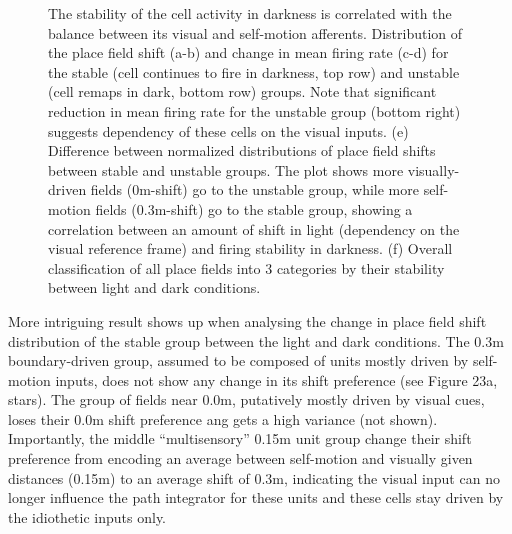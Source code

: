 \begin{figure}
\captionsetup{format=plain}
\caption[Stability explained by self-motion inputs]{
The stability of the cell activity in darkness is correlated with the balance between its visual and self-motion afferents. Distribution of the place field shift (a-b) and change in mean firing rate (c-d) for the stable (cell continues to fire in darkness, top row) and unstable (cell remaps in dark, bottom row) groups. Note that significant reduction in mean firing rate for the unstable group (bottom right) suggests dependency of these cells on the visual inputs. (e) Difference between normalized distributions of place field shifts between stable and unstable groups. The plot shows more visually-driven fields (0m-shift) go to the unstable group, while more self-motion fields (0.3m-shift) go to the stable group, showing a correlation between an amount of shift in light (dependency on the visual reference frame) and firing stability in darkness. (f) Overall classification of all place fields into 3 categories by their stability between light and dark conditions.
}
\label{fig:F22_stable_unstable}
\end{figure}

More intriguing result shows up when analysing the change in place field shift distribution of the stable group between the light and dark conditions. The 0.3m boundary-driven group, assumed to be composed of units mostly driven by self-motion inputs, does not show any change in its shift preference (see Figure 23a, stars). The group of fields near 0.0m, putatively mostly driven by visual cues, loses their 0.0m shift preference ang gets a high variance (not shown). Importantly, the middle “multisensory” 0.15m unit group change their shift preference from encoding an average between self-motion and visually given distances (0.15m) to an average shift of 0.3m, indicating the visual input can no longer influence the path integrator for these units and these cells stay driven by the idiothetic inputs only.

